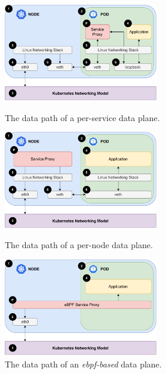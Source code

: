 \begin{figure}[p]
    \centering
    \includegraphics[width=0.6\textwidth]{3_systems_survey/figures/sm-per-service-small.pdf}
    \caption[Per-service proxy plane architecture.]{The data path of a per-service data plane.}
    \label{fig:sm-arch-per-service}
    
    \vspace*{1cm}
    
    \includegraphics[width=0.6\textwidth]{3_systems_survey/figures/sm-per-node-small.pdf}
    \caption[Per-node proxy plane architecture.]{The data path of a per-node data plane.}
    \label{fig:sm-arch-per-node}
    
    \vspace*{1cm}
   
    \includegraphics[width=0.6\textwidth]{3_systems_survey/figures/sm-ebpf-small.pdf}  
    \caption[\Gls{ebpf}-based data plane architecture.]{The data path of an \textit{\gls{ebpf}-based} data plane.}
    \label{fig:sm-arch-ebpf}
\end{figure}


